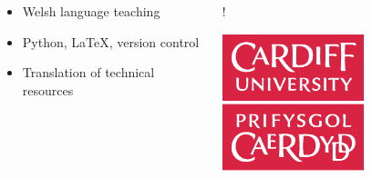 \documentclass{beamer}
\begin{document}
\begin{frame}
  \begin{columns}
    \begin{column}{0.5\textwidth}
      \begin{itemize}
        \setlength\itemsep{3em}
        \item Welsh language teaching
        \item Python, \LaTeX, version control
        \item Translation of technical resources
      \end{itemize}
    \end{column}
    \begin{column}{0.5\textwidth}
      \begin{center}
        \resizebox {\columnwidth} {!} {
        }
        \begin{center}
          \includegraphics[width=0.6\textwidth]{cflogo}
        \end{center}
      \end{center}
    \end{column}
  \end{columns}
\end{frame}
\end{document}
